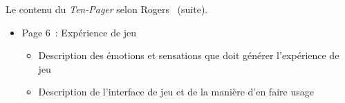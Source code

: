 \begin{table}
\begin{framed}
\begin{itemize}
\end{itemize}
\end{framed}
\end{table}

\addtocounter{table}{-1}

\begin{table}[H]
\caption{Le contenu du \emph{Ten-Pager} selon Rogers~\cite{LevelUpRogers2014} (suite).}
\footnotesize
\begin{framed}
\begin{itemize}
    \item Page 6~: Expérience de jeu
    \begin{itemize}
        \item Description des émotions et sensations que doit générer l'expérience de jeu
        \item Description de l'interface de jeu et de la manière d'en faire usage



\end{itemize}
\end{itemize}
\end{framed}
\end{table}
